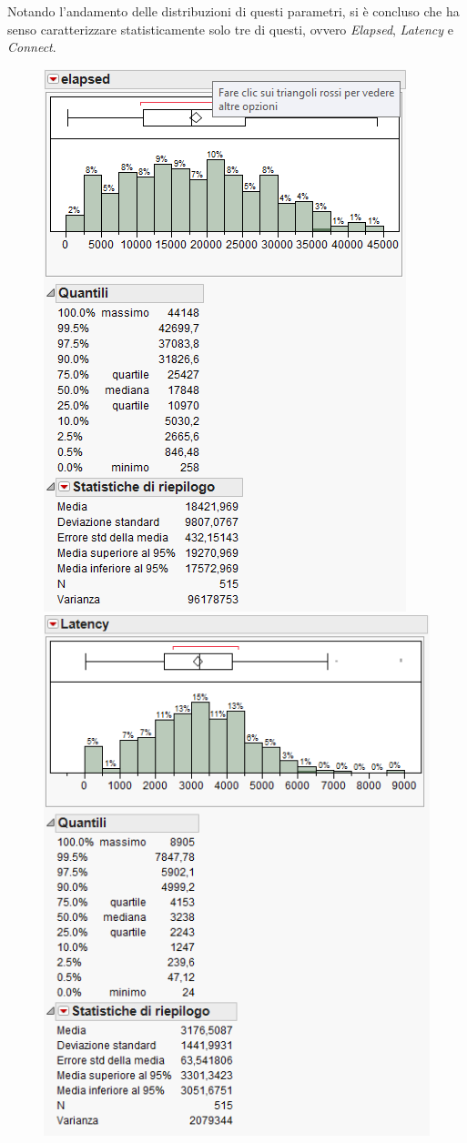 		Notando l'andamento delle distribuzioni di questi parametri, si è concluso che ha senso caratterizzare statisticamente solo tre di questi, ovvero \textit{Elapsed}, \textit{Latency} e \textit{Connect}.
		
		\begin{figure}[H]
			\centering
			\includegraphics[scale=0.6]{./immagine/elapsed.png}\quad\includegraphics[scale=0.6]{./immagine/latency.png}

\end{figure}
